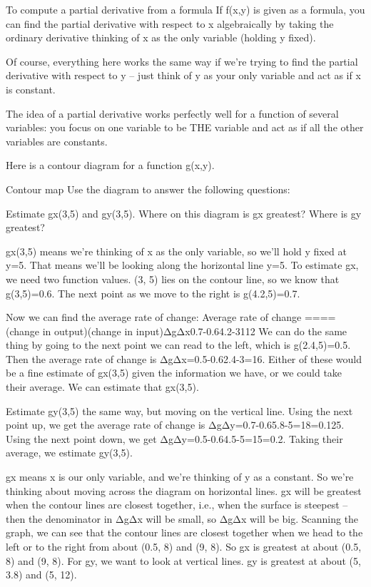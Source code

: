 To compute a partial derivative from a formula
If f(x,y) is given as a formula, you can find the partial derivative with respect to x algebraically by taking the ordinary derivative thinking of x as the only variable (holding y fixed).

Of course, everything here works the same way if we're trying to find the partial derivative with respect to y – just think of y as your only variable and act as if x is constant.

The idea of a partial derivative works perfectly well for a function of several variables: you focus on one variable to be THE variable and act as if all the other variables are constants.

\begin{example}
Here is a contour diagram for a function g(x,y).

Contour map
Use the diagram to answer the following questions:

Estimate gx(3,5) and gy(3,5).
Where on this diagram is gx greatest? Where is gy greatest?

\begin{solution} gx(3,5) means we're thinking of x as the only variable, so we'll hold y fixed at y=5. That means we’ll be looking along the horizontal line y=5. To estimate gx, we need two function values. (3, 5) lies on the contour line, so we know that g(3,5)=0.6. The next point as we move to the right is g(4.2,5)=0.7.

Now we can find the average rate of change:
Average rate of change ====(change in output)(change in input)ΔgΔx0.7-0.64.2-3112
We can do the same thing by going to the next point we can read to the left, which is g(2.4,5)=0.5. Then the average rate of change is
ΔgΔx=0.5-0.62.4-3=16.
Either of these would be a fine estimate of gx(3,5) given the information we have, or we could take their average. We can estimate that gx(3,5).

Estimate gy(3,5) the same way, but moving on the vertical line. Using the next point up, we get the average rate of change is
ΔgΔy=0.7-0.65.8-5=18=0.125.
Using the next point down, we get
ΔgΔy=0.5-0.64.5-5=15=0.2.
Taking their average, we estimate gy(3,5).

gx means x is our only variable, and we're thinking of y as a constant. So we're thinking about moving across the diagram on horizontal lines. gx will be greatest when the contour lines are closest together, i.e., when the surface is steepest – then the denominator in ΔgΔx will be small, so ΔgΔx will be big. Scanning the graph, we can see that the contour lines are closest together when we head to the left or to the right from about (0.5, 8) and (9, 8). So gx is greatest at about (0.5, 8) and (9, 8). For gy, we want to look at vertical lines. gy is greatest at about (5, 3.8) and (5, 12).
\end{solution}\end{example}

